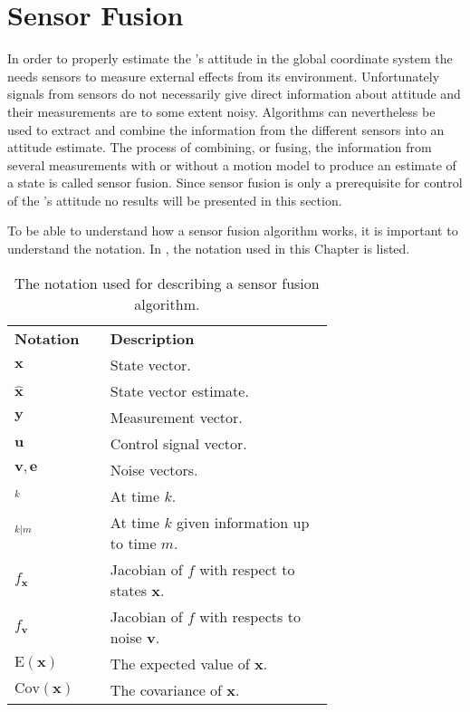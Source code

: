 \chapter{Sensor Fusion}\label{cha:sensor_fusion}
In order to properly estimate the \abbrROV's attitude in the global coordinate system the \abbrROV needs sensors to measure external effects from its environment.
Unfortunately signals from sensors do not necessarily give direct information about attitude and their measurements are to some extent noisy. Algorithms can nevertheless be used to extract and combine the information from the different sensors into an attitude estimate. The process of combining, or fusing, the information from several measurements with or without a motion model to produce an estimate of a state is called sensor fusion. Since sensor fusion is only a prerequisite for control of the \abbrROV's attitude no results will be presented in this section. 

To be able to understand how a sensor fusion algorithm works, it is important to understand the notation. In  , the notation used in this Chapter is listed.
 \begin{table}[htbp]
  \centering
  \caption{\label{tab:notationKalman}%
    The notation used for describing a sensor fusion algorithm.}
    \begin{tabular}{l p{0.7\linewidth}}
    \toprule%
    \textbf{Notation} & \textbf{Description} \\
    \otoprule%
    $\boldsymbol{x}$ & State vector.\\
    $\hat{\boldsymbol{x}}$ & State vector estimate.\\
    $\boldsymbol{y}$ & Measurement vector.\\
    $\boldsymbol{u}$ & Control signal vector.\\
    $\boldsymbol{v},\boldsymbol{e}$ & Noise vectors.\\
    $_k$ & At time $k$.\\
    $_{k|m}$ & At time $k$ given information up to time $m$.\\
    $f_{\boldsymbol{x}}$ & Jacobian of $f$ with respect to states $\boldsymbol{x}$.\\
    $f_{\boldsymbol{v}}$ & Jacobian of $f$ with respects to noise $\boldsymbol{v}$.\\
    $\text{E}(\boldsymbol{x})$ & The expected value of $\boldsymbol{x}$.\\
    $\text{Cov}(\boldsymbol{x})$ & The covariance of $\boldsymbol{x}$.\\
    \bottomrule%
 \end{tabular}
\end{table}

